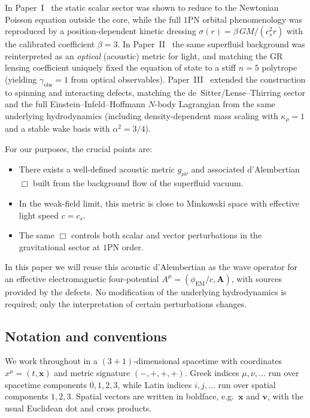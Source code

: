 \documentclass[11pt]{article}
\newcommand{\cS}{c_s}
\begin{document}
In Paper~I~\cite{Norris:2025Orbits} the static scalar sector was shown to reduce to the Newtonian Poisson equation outside the core, while the full $1$PN orbital phenomenology was reproduced by a position-dependent kinetic dressing $\sigma(r)=\beta\,GM/(c_s^2 r)$ with the calibrated coefficient $\beta=3$.  In Paper~II~\cite{Norris:Paper2} the same superfluid background was reinterpreted as an \emph{optical} (acoustic) metric for light, and matching the GR lensing coefficient uniquely fixed the equation of state to a stiff $n=5$ polytrope (yielding $\gamma_{\mathrm{obs}}=1$ from optical observables).  Paper~III~\cite{Norris:Paper3} extended the construction to spinning and interacting defects, matching the de~Sitter/Lense--Thirring sector and the full Einstein--Infeld--Hoffmann $N$-body Lagrangian from the same underlying hydrodynamics (including density-dependent mass scaling with $\kappa_\rho=1$ and a stable wake basis with $\alpha^2=3/4$).

For our purposes, the crucial points are:

\begin{itemize}
  \item There exists a well-defined acoustic metric $g_{\mu\nu}$ and associated d'Alembertian $\Box$ built from the background flow of the superfluid vacuum.
  \item In the weak-field limit, this metric is close to Minkowski space with effective light speed $c = \cS$.
  \item The same $\Box$ controls both scalar and vector perturbations in the gravitational sector at $1$PN order.
\end{itemize}

In this paper we will reuse this acoustic d'Alembertian as the wave operator for an effective electromagnetic four-potential $A^\mu = (\phi_{\mathrm{EM}}/c,\mathbf{A})$, with sources provided by the defects.  No modification of the underlying hydrodynamics is required; only the interpretation of certain perturbations changes.

\subsection{Notation and conventions}

We work throughout in a $(3+1)$-dimensional spacetime with coordinates $x^\mu = (t,\mathbf{x})$ and metric signature $(-,+,+,+)$.  Greek indices $\mu,\nu,\ldots$ run over spacetime components $0,1,2,3$, while Latin indices $i,j,\ldots$ run over spatial components $1,2,3$.  Spatial vectors are written in boldface, e.g.\ $\mathbf{x}$ and $\mathbf{v}$, with the usual Euclidean dot and cross products.
\end{document}
